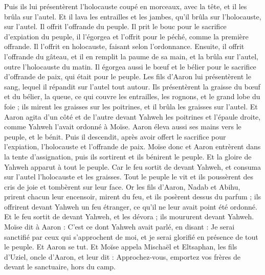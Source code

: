 \begin{multicols}{2}
Puis ils lui présentèrent l'holocauste coupé en morceaux, avec la tête, et il les brûla sur l'autel.
Et il lava les entrailles et les jambes, qu'il brûla sur l'holocauste, sur l'autel.
Il offrit l'offrande du peuple. Il prit le bouc pour le sacrifice d'expiation du peuple, il l'égorgea et l'offrit pour le péché, comme la première offrande.
Il l'offrit en holocauste, faisant selon l'ordonnance.
Ensuite, il offrit l'offrande du gâteau, et il en remplit la paume de sa main, et la brûla sur l'autel, outre l'holocauste du matin.
Il égorgea aussi le bœuf et le bélier pour le sacrifice d'offrande de paix, qui était pour le peuple. Les fils d'Aaron lui présentèrent le sang, lequel il répandit sur l'autel tout autour.
Ils présentèrent la graisse du bœuf et du bélier, la queue, ce qui couvre les entrailles, les rognons, et le grand lobe du foie ;
ils mirent les graisses sur les poitrines, et il brûla les graisses sur l'autel.
Et Aaron agita d'un côté et de l'autre devant Yahweh les poitrines et l'épaule droite, comme Yahweh l'avait ordonné à Moïse.
Aaron éleva aussi ses mains vers le peuple, et le bénit. Puis il descendit, après avoir offert le sacrifice pour l'expiation, l'holocauste et l'offrande de paix.
Moïse donc et Aaron entrèrent dans la tente d'assignation, puis ils sortirent et ils bénirent le peuple. Et la gloire de Yahweh apparut à tout le peuple.
Car le feu sortit de devant Yahweh, et consuma sur l'autel l'holocauste et les graisses. Tout le peuple le vit et ils poussèrent des cris de joie et tombèrent sur leur face.
\VerseOne{}Or les fils d'Aaron, Nadab et Abihu, prirent chacun leur encensoir, mirent du feu, et ils posèrent dessus du parfum ; ils offrirent devant Yahweh un feu étranger, ce qu'il ne leur avait point été ordonné.
Et le feu sortit de devant Yahweh, et les dévora ; ils moururent devant Yahweh.
Moïse dit à Aaron : C'est ce dont Yahweh avait parlé, en disant : Je serai sanctifié par ceux qui s'approchent de moi, et je serai glorifié en présence de tout le peuple. Et Aaron se tut.
Et Moïse appela Mischaël et Eltsaphan, les fils d'Uziel, oncle d'Aaron, et leur dit : Approchez-vous, emportez vos frères de devant le sanctuaire, hors du camp.

\end{multicols}
